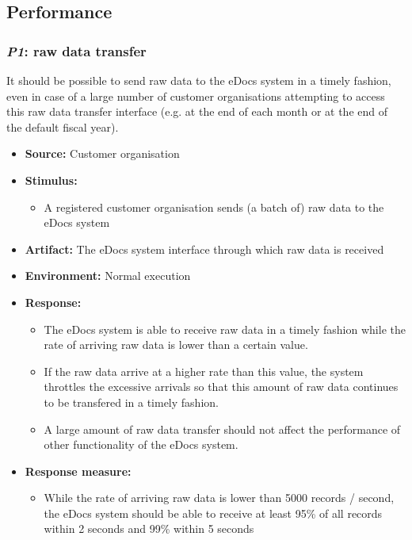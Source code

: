 \documentclass[a4paper,10pt]{article}
\begin{document}
\subsection{Performance}
\subsubsection{\emph{P1}: raw data transfer }
It should  be possible to send raw data to the eDocs system in a timely fashion, even in case of a large number of customer organisations attempting to access this raw data transfer interface (e.g. at the end of each month or at the end of the default fiscal year).

\begin{itemize}
    \item \textbf{Source:} Customer organisation
    \item \textbf{Stimulus:}
        \begin{itemize}
            \item A registered customer organisation sends (a batch of) raw data to the eDocs system
        \end{itemize}

    \item \textbf{Artifact:} The eDocs system interface through which raw data is received
    \item \textbf{Environment:} Normal execution
    \item \textbf{Response:}
        \begin{itemize}
		\item The eDocs system is able to receive raw data in a timely fashion while the rate of arriving raw data is lower than a certain value.
		\item If the raw data arrive at a higher rate than this value, the system throttles the excessive arrivals so that this amount of raw data continues to be transfered in a timely fashion.
		\item A large amount of raw data transfer should not affect the performance of other functionality of the eDocs system.
        \end{itemize}

    \item \textbf{Response measure:}
        \begin{itemize}
		\item While the rate of arriving raw data is lower than 5000 records / second, the eDocs system should be able to receive at least 95\% of all records within 2 seconds and 99\% within 5 seconds
	\end{itemize}
\end{itemize}
\end{document}
